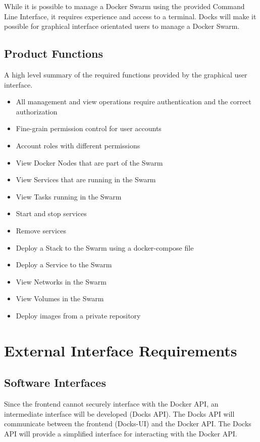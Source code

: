 \documentclass[]{article}
\begin{document}
While it is possible to manage a Docker Swarm using the provided Command Line Interface, it requires experience and access to a terminal. Docks will make it possible for graphical interface orientated users to manage a Docker Swarm.

\subsection{Product Functions}
A high level summary of the required functions provided by the graphical user interface.

\begin{itemize}
	\item All management and view operations require authentication and the correct authorization
	\item Fine-grain permission control for user accounts
	\item Account roles with different permissions
	\item View Docker Nodes that are part of the Swarm
	\item View Services that are running in the Swarm
	\item View Tasks running in the Swarm
	\item Start and stop services
	\item Remove services
	\item Deploy a Stack to the Swarm using a docker-compose file
	\item Deploy a Service to the Swarm
	\item View Networks in the Swarm
	\item View Volumes in the Swarm
	\item Deploy images from a private repository
\end{itemize}

\section{External Interface Requirements}
\subsection{Software Interfaces}
Since the frontend cannot securely interface with the Docker API, an intermediate interface will be developed (Docks API). The Docks API will communicate between the frontend (Docks-UI) and the Docker API. The Docks API will provide a simplified interface for interacting with the Docker API.
\end{document}
